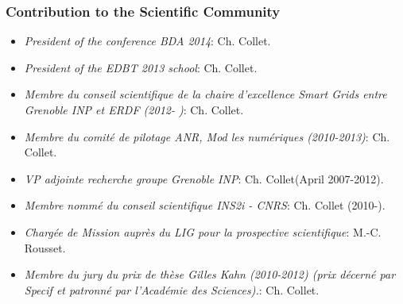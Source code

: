 \subsubsection*{Contribution to the Scientific Community}


\begin{itemize}
\setlength{\itemindent}{-0.5cm}
\setlength{\itemsep}{-0.1cm}
\item {\it President of the conference BDA 2014}: Ch. Collet.

\item {\it President of the EDBT 2013 school}: Ch. Collet.

\item {\it Membre du conseil scientifique de la chaire d'excellence Smart Grids entre Grenoble INP et ERDF (2012- )}: Ch. Collet.

\item {\it Membre du comit{\'e} de pilotage ANR, Mod les num{\'e}riques (2010-2013)}: Ch. Collet.

\item {\it VP adjointe recherche groupe Grenoble INP}: Ch. Collet(April 2007-2012).

\item {\it Membre nomm{\'e}  du conseil scientifique INS2i - CNRS}: Ch. Collet (2010-).

\item {\it Charg{\'e}e de Mission aupr{\`e}s du LIG pour la prospective scientifique}: M.-C. Rousset.

\item {\it Membre du jury du prix de th{\`e}se Gilles Kahn (2010-2012)
(prix d{\'e}cern{\'e} par Specif et patronn{\'e} par l'Acad{\'e}mie des Sciences).}: Ch. Collet.



\end{itemize}

